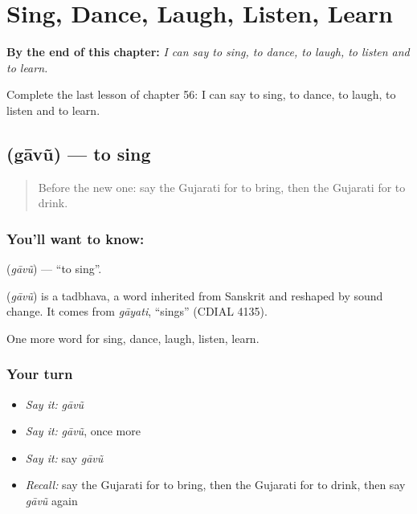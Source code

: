 
\chapter{Sing, Dance, Laugh, Listen, Learn}
\label{ch:gu-sing-dance-laugh-listen-learn}

\begin{chapteropening}
\textbf{By the end of this chapter:} \emph{I can say to sing, to dance, to laugh, to listen and to learn.}

Complete the last lesson of chapter 56: I can say to sing, to dance, to laugh, to listen and to learn.
\end{chapteropening}

\section[\texorpdfstring{\gu{ગાવું} (gāvũ)}{ગાવું (gāvũ)}]{ (gāvũ) — to sing}

\label{lesson:GU-C56-gaavu}



\begin{quote}
Before the new one: say the Gujarati for to bring, then the Gujarati for to drink.
\end{quote}

\subsection*{You'll want to know: }
\textbf{} (\emph{gāvũ}) — \textquotedblleft{}to sing\textquotedblright{}.

\begin{cousinweb}
\textbf{} (\emph{gāvũ}) is a tadbhava, a word inherited from Sanskrit and reshaped by sound change. It comes from \emph{gāyati}, \textquotedblleft{}sings\textquotedblright{} (CDIAL 4135).
\end{cousinweb}

\begin{grammarlens}[title={What you've built}]
One more word for sing, dance, laugh, listen, learn.
\end{grammarlens}

\subsection*{Your turn}
\begin{itemize}
\raggedright
  \item \emph{Say it:} \emph{gāvũ}
  \item \emph{Say it:} \emph{gāvũ}, once more
  \item \emph{Say it:} say \emph{gāvũ}
  \item \emph{Recall:} say the Gujarati for to bring, then the Gujarati for to drink, then say \emph{gāvũ} again
\end{itemize}

